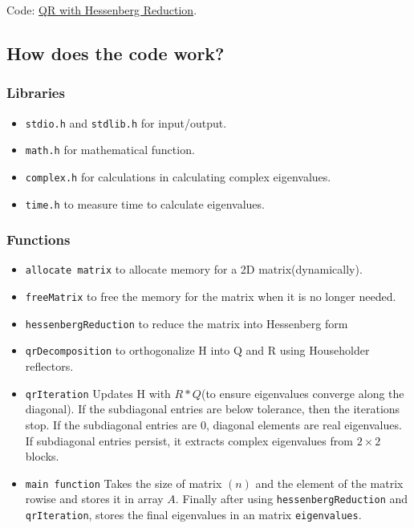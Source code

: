 \documentclass[12pt,oneside,letterpaper,english]{article}
\begin{document}
Code: \href{https://github.com/igiamronit/Software-assignment/blob/main/Software%20assignment/eigen.c}{QR with Hessenberg Reduction}.

\subsection{How does the code work?}
\subsubsection{Libraries}
\begin{itemize}
    \item \texttt{stdio.h} and \texttt{stdlib.h} for input/output.
    \item \texttt{math.h} for mathematical function.
    \item \texttt{complex.h} for calculations in calculating complex eigenvalues.
    \item \texttt{time.h} to measure time to calculate eigenvalues.
\end{itemize}

\subsubsection{Functions}
\begin{itemize}
    \item \texttt{allocate matrix} to allocate memory for a 2D matrix(dynamically).
    \item \texttt{freeMatrix} to free the memory for the matrix when it is no longer needed.
    \item \texttt{hessenbergReduction} to reduce the matrix into Hessenberg form
    \item \texttt{qrDecomposition} to orthogonalize H into Q and R using Householder reflectors.
    \item \texttt{qrIteration} Updates H with $R*Q$(to ensure eigenvalues converge along the diagonal). If the subdiagonal entries are below tolerance, then the iterations stop. If the subdiagonal entries are 0, diagonal elements are real eigenvalues. If subdiagonal entries persist, it extracts complex eigenvalues from $2\times2$ blocks.
    \item \texttt{main function} Takes the size of matrix $(n)$ and the element of the matrix rowise and stores it in array $A$. Finally after using \texttt{hessenbergReduction} and \texttt{qrIteration}, stores the final eigenvalues in an matrix \texttt{eigenvalues}.
\end{itemize}
\end{document}
